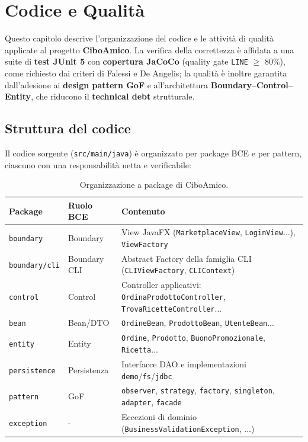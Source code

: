 \chapter{Codice e Qualità}
\label{cap:qualita}

Questo capitolo descrive l'organizzazione del codice e le attività di qualità
applicate al progetto \textbf{CiboAmico}. La verifica della correttezza è
affidata a una suite di \textbf{test JUnit 5} con \textbf{copertura JaCoCo}
(quality gate \texttt{LINE} $\geq$ 80\%), come richiesto dai criteri di Falessi
e De Angelis; la qualità è inoltre garantita dall'adesione ai \textbf{design
pattern GoF} e all'architettura \textbf{Boundary--Control--Entity}, che
riducono il \textbf{technical debt} strutturale.

\section{Struttura del codice}
\label{sec:qualita_struttura}

Il codice sorgente (\texttt{src/main/java}) è organizzato per package BCE e per
pattern, ciascuno con una responsabilità netta e verificabile:

\begin{table}[H]
    \centering
    \small
    \begin{tabular}{@{}llp{9cm}@{}}
        \toprule
        \textbf{Package} & \textbf{Ruolo BCE} & \textbf{Contenuto} \\ \midrule
        \texttt{boundary} & Boundary & View JavaFX (\texttt{MarketplaceView}, \texttt{LoginView}...), \texttt{ViewFactory} \\
        \texttt{boundary/cli} & Boundary CLI & Abstract Factory della famiglia CLI (\texttt{CLIViewFactory}, \texttt{CLIContext}) \\
        \texttt{control} & Control & Controller applicativi: \texttt{OrdinaProdottoController}, \texttt{TrovaRicetteController}... \\
        \texttt{bean} & Bean/DTO & \texttt{OrdineBean}, \texttt{ProdottoBean}, \texttt{UtenteBean}... \\
        \texttt{entity} & Entity & \texttt{Ordine}, \texttt{Prodotto}, \texttt{BuonoPromozionale}, \texttt{Ricetta}... \\
        \texttt{persistence} & Persistenza & Interfacce DAO e implementazioni \texttt{demo}/\texttt{fs}/\texttt{jdbc} \\
        \texttt{pattern} & GoF & \texttt{observer}, \texttt{strategy}, \texttt{factory}, \texttt{singleton}, \texttt{adapter}, \texttt{facade} \\
        \texttt{exception} & - & Eccezioni di dominio (\texttt{BusinessValidationException}, ...) \\
        \bottomrule
    \end{tabular}
    \caption{Organizzazione a package di CiboAmico.}
    \label{tab:struttura}
\end{table}

